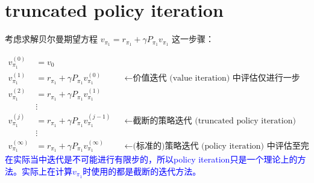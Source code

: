 \documentclass{article}
\begin{document}
\section{truncated policy iteration}
考虑求解贝尔曼期望方程 $v_{\pi_1} = r_{\pi_1} + \gamma P_{\pi_1} v_{\pi_1}$ 这一步骤：

\begin{align*}
    v_{\pi_1}^{(0)} &= v_0 \\
    v_{\pi_1}^{(1)} &= r_{\pi_1} + \gamma P_{\pi_1} v_{\pi_1}^{(0)} && \leftarrow \text{价值迭代 (value iteration) 中评估仅进行一步} \\
    v_{\pi_1}^{(2)} &= r_{\pi_1} + \gamma P_{\pi_1} v_{\pi_1}^{(1)} \\
    &\vdots \\
    v_{\pi_1}^{(j)} &= r_{\pi_1} + \gamma P_{\pi_1} v_{\pi_1}^{(j-1)} && \leftarrow \text{截断的策略迭代 (truncated policy iteration)} \\
    &\vdots \\
    v_{\pi_1}^{(\infty)} &= r_{\pi_1} + \gamma P_{\pi_1} v_{\pi_1}^{(\infty)} && \leftarrow \text{(标准的)策略迭代 (policy iteration) 中评估至完全收敛}
\end{align*}
\textcolor{blue}{\kaishu*在实际当中迭代是不可能进行有限步的，所以policy iteration只是一个理论上的方法。实际上在计算$v_{\pi_1}$时使用的都是截断的迭代方法。}
\end{document}
